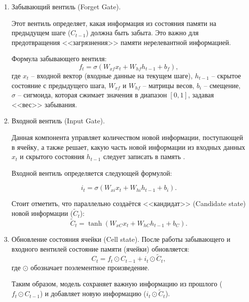 \documentclass[spec, och, diploma]{SCWorks}
\begin{document}
  \begin{enumerate}
    
    \item Забывающий вентиль (Forget Gate).
    
    Этот вентиль определяет, какая информация из состояния памяти на предыдущем шаге ($C_{t-1}$) должна быть забыта.  
    Это важно для предотвращения <<загрязнения>> памяти нерелевантной информацией.  
    
    Формула забывающего вентиля:  
    \begin{equation}      
        f_t = \sigma(W_{xf}x_t + W_{hf}h_{t-1} + b_f),
    \end{equation}
     где $x_t$ -- входной вектор (входные данные на текущем шаге), $h_{t-1}$ -- скрытое состояние с предыдущего шага, $W_{xf}$ и $W_{hf}$ -- матрицы весов,
     $b_i$ -- смещение, $\sigma$ -- сигмоида, которая сжимает значения в диапазон $[0, 1]$, задавая <<вес>> забывания.

    \item Входной вентиль (Input Gate).
    
    Данная компонента управляет количеством новой информации, поступающей в ячейку, а также решает, 
    какую часть новой информации из входных данных \(x_t\) и скрытого состояния \(h_{t-1}\) 
    следует записать в память \cite{lstm2}.

    Входной вентиль определяется следующей формулой:  

    \begin{equation}
        i_t = \sigma(W_{xi}x_t + W_{hi}h_{t-1} + b_i).
    \end{equation}
    
    Стоит отметить, что параллельно создаётся <<кандидат>> (Candidate state) новой информации (\(\tilde{C}_t\)):  
    \begin{equation}
      \tilde{C}_t = \tanh(W_{xC}x_t + W_{hC}h_{t-1} + b_C).      
    \end{equation}

    \item Обновление состояния ячейки (Cell state). 
    После работы забывающего и входного вентилей состояние памяти (ячейки) обновляется:  
    \begin{equation}
        C_t = f_t \odot C_{t-1} + i_t \odot \tilde{C}_t,
    \end{equation}
    где \(\odot\) обозначает поэлементное произведение.  
    
    Таким образом, модель сохраняет важную информацию из прошлого (\(f_t \odot C_{t-1}\)) и добавляет новую информацию (\(i_t \odot \tilde{C}_t\)).
 

\end{enumerate}
\end{document}
